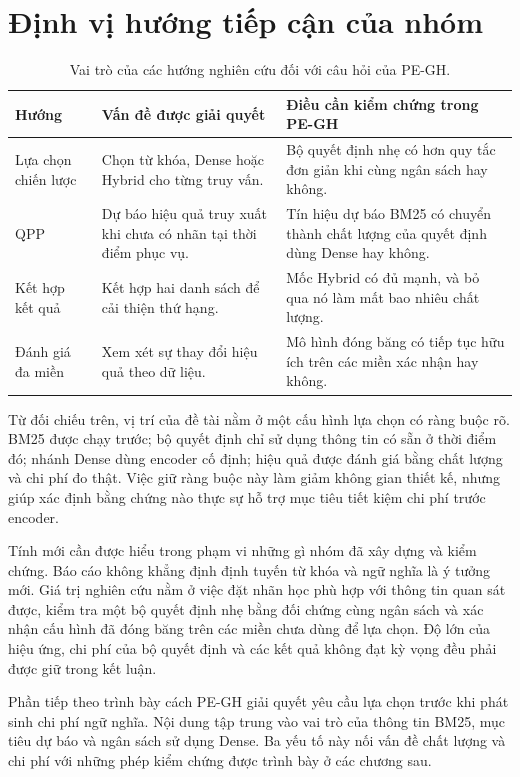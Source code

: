 \section{Định vị hướng tiếp cận của nhóm}
\begin{table}[htbp]
\centering\small
\caption{Vai trò của các hướng nghiên cứu đối với câu hỏi của PE-GH.}
\label{tab:related}
\begin{tabularx}{\textwidth}{@{}p{31mm}YY@{}}
\hline
\textbf{Hướng} & \textbf{Vấn đề được giải quyết} & \textbf{Điều cần kiểm chứng trong PE-GH}\\\hline
Lựa chọn chiến lược & Chọn từ khóa, Dense hoặc Hybrid cho từng truy vấn. & Bộ quyết định nhẹ có hơn quy tắc đơn giản khi cùng ngân sách hay không.\\
QPP & Dự báo hiệu quả truy xuất khi chưa có nhãn tại thời điểm phục vụ. & Tín hiệu dự báo BM25 có chuyển thành chất lượng của quyết định dùng Dense hay không.\\
Kết hợp kết quả & Kết hợp hai danh sách để cải thiện thứ hạng. & Mốc Hybrid có đủ mạnh, và bỏ qua nó làm mất bao nhiêu chất lượng.\\
Đánh giá đa miền & Xem xét sự thay đổi hiệu quả theo dữ liệu. & Mô hình đóng băng có tiếp tục hữu ích trên các miền xác nhận hay không.\\
\hline
\end{tabularx}
\end{table}

Từ đối chiếu trên, vị trí của đề tài nằm ở một cấu hình lựa chọn có ràng buộc rõ. BM25 được chạy trước; bộ quyết định chỉ sử dụng thông tin có sẵn ở thời điểm đó; nhánh Dense dùng encoder cố định; hiệu quả được đánh giá bằng chất lượng và chi phí đo thật. Việc giữ ràng buộc này làm giảm không gian thiết kế, nhưng giúp xác định bằng chứng nào thực sự hỗ trợ mục tiêu tiết kiệm chi phí trước encoder.

Tính mới cần được hiểu trong phạm vi những gì nhóm đã xây dựng và kiểm chứng. Báo cáo không khẳng định định tuyến từ khóa và ngữ nghĩa là ý tưởng mới. Giá trị nghiên cứu nằm ở việc đặt nhãn học phù hợp với thông tin quan sát được, kiểm tra một bộ quyết định nhẹ bằng đối chứng cùng ngân sách và xác nhận cấu hình đã đóng băng trên các miền chưa dùng để lựa chọn. Độ lớn của hiệu ứng, chi phí của bộ quyết định và các kết quả không đạt kỳ vọng đều phải được giữ trong kết luận.

Phần tiếp theo trình bày cách PE-GH giải quyết yêu cầu lựa chọn trước khi phát sinh chi phí ngữ nghĩa. Nội dung tập trung vào vai trò của thông tin BM25, mục tiêu dự báo và ngân sách sử dụng Dense. Ba yếu tố này nối vấn đề chất lượng và chi phí với những phép kiểm chứng được trình bày ở các chương sau.
